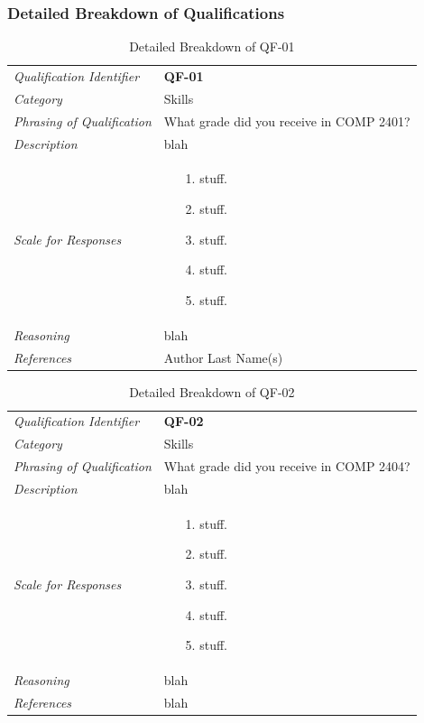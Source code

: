 \documentclass[12pt,letterpaper]{article}
\begin{document}
\subsubsection{Detailed Breakdown of Qualifications}

\begin{table}[H]
	\caption{Detailed Breakdown of QF-01}
	\begin{tabu} to 
		\toprule
		Qualification Identifier & {\bf QF-01}\\
		Category & Skills \\
		Phrasing of Qualification & What grade did you receive in COMP 2401? \\
		Description & blah\\
		Scale for Responses &
		\begin{minipage}[t]{\linewidth}
			\begin{enumerate}
				\item[1.] stuff.
				\item[2.] stuff.
				\item[3.] stuff.
				\item[4.] stuff.
				\item[5.] stuff.
			\end{enumerate}
		\end{minipage}\\
		Reasoning & blah\\
		References & Author Last Name(s)\cite{example}\\
		\toprule
	\end{tabu}
\end{table}

\begin{table}[H]
	\caption{Detailed Breakdown of QF-02}
	\begin{tabu} to 
		\toprule
		Qualification Identifier & {\bf QF-02}\\
		Category & Skills \\
		Phrasing of Qualification & What grade did you receive in COMP 2404? \\
		Description & blah\\
		Scale for Responses &
		\begin{minipage}[t]{\linewidth}
			\begin{enumerate}
				\item[1.] stuff.
				\item[2.] stuff.
				\item[3.] stuff.
				\item[4.] stuff.
				\item[5.] stuff.
			\end{enumerate}
		\end{minipage}\\
		Reasoning & blah\\
		References & blah\\
		\toprule
	\end{tabu}
\end{table}
\end{document}
